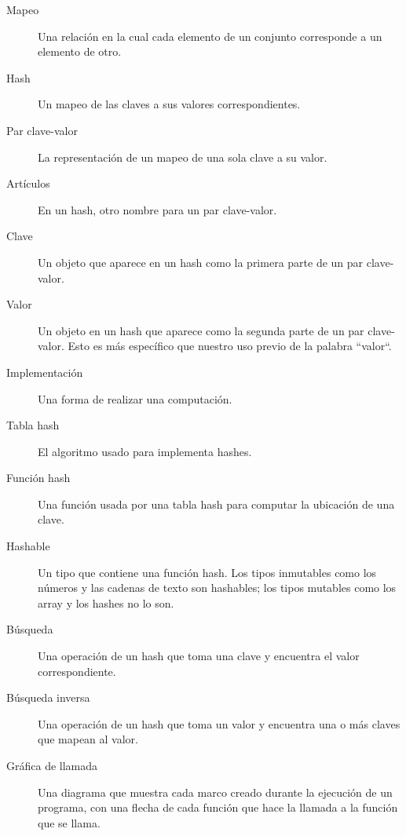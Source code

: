 \begin{description}

\item[Mapeo] Una relación en la cual cada elemento de un
conjunto corresponde a un elemento de otro.

\item[Hash] Un mapeo de las claves a sus valores correspondientes.

\item[Par clave-valor] La representación de un mapeo de una sola clave
a su valor.

\item[Artículos] En un hash, otro nombre para un par clave-valor.

\item[Clave] Un objeto que aparece en un hash como la primera parte
de un par clave-valor.

\item[Valor] Un objeto en un hash que aparece como la segunda parte de 
un par clave-valor. Esto es más específico que nuestro uso previo de
la palabra ``valor``.

\item[Implementación] Una forma de realizar una computación.

\item[Tabla hash] El algoritmo usado para implementa hashes.

\item[Función hash] Una función usada por una tabla hash para computar
la ubicación de una clave.

\item[Hashable] Un tipo que contiene una función hash. Los tipos inmutables
como los números y las cadenas de texto son hashables; los tipos
mutables como los array y los hashes no lo son.

\item[Búsqueda] Una operación de un hash que toma una clave y encuentra
el valor correspondiente.

\item[Búsqueda inversa] Una operación de un hash que toma un valor 
y encuentra una o más claves que mapean al valor.

\item[Gráfica de llamada] Una diagrama que muestra cada marco creado 
durante la ejecución de un programa, con una flecha de cada función
que hace la llamada a la función que se llama.


\end{description}
